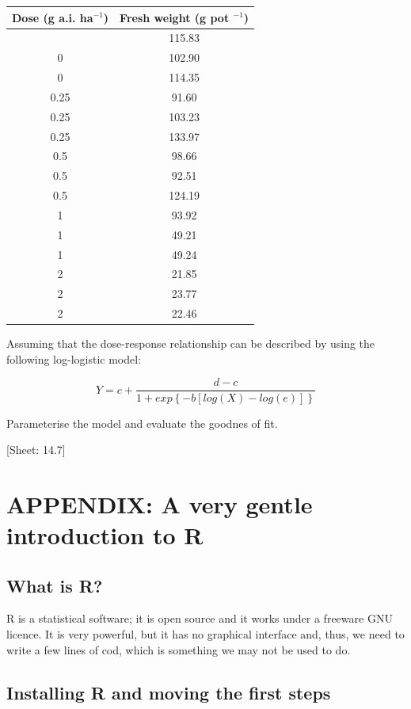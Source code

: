 \documentclass[a4paper,12pt,oneside]{book}
\begin{document}
\begin{longtable}[]{@{}cc@{}}
\toprule\noalign{}
Dose (g a.i. ha\(^{-1}\)) & Fresh weight (g pot \(^{-1}\)) \\
\midrule\noalign{}
\endhead
\bottomrule\noalign{}
\endlastfoot
0 & 115.83 \\
0 & 102.90 \\
0 & 114.35 \\
0.25 & 91.60 \\
0.25 & 103.23 \\
0.25 & 133.97 \\
0.5 & 98.66 \\
0.5 & 92.51 \\
0.5 & 124.19 \\
1 & 93.92 \\
1 & 49.21 \\
1 & 49.24 \\
2 & 21.85 \\
2 & 23.77 \\
2 & 22.46 \\
\end{longtable}

Assuming that the dose-response relationship can be described by using the following log-logistic model:

\[Y = c + \frac{d - c}{1 + exp \left\{ - b \left[ log (X) - log (e) \right] \right\}}\]

Parameterise the model and evaluate the goodnes of fit.

{[}Sheet: 14.7{]}

\hypertarget{appendix-a-very-gentle-introduction-to-r}{%
\chapter{APPENDIX: A very gentle introduction to R}\label{appendix-a-very-gentle-introduction-to-r}}

\hypertarget{what-is-r}{%
\section{What is R?}\label{what-is-r}}

R is a statistical software; it is open source and it works under a freeware GNU licence. It is very powerful, but it has no graphical interface and, thus, we need to write a few lines of cod, which is something we may not be used to do.

\hypertarget{installing-r-and-moving-the-first-steps}{%
\section{Installing R and moving the first steps}\label{installing-r-and-moving-the-first-steps}}
\end{document}
